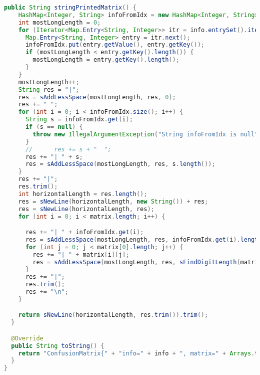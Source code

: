 \begin{lstlisting}[language=Java,basicstyle=\tiny,caption=ConfusionMatrix.java]
  public String stringPrintedMatrix() {
    HashMap<Integer, String> infoFromIdx = new HashMap<Integer, String>();
    int mostLongLength = 0;
    for (Iterator<Map.Entry<String, Integer>> itr = info.entrySet().iterator(); itr.hasNext(); ) {
      Map.Entry<String, Integer> entry = itr.next();
      infoFromIdx.put(entry.getValue(), entry.getKey());
      if (mostLongLength < entry.getKey().length()) {
        mostLongLength = entry.getKey().length();
      }
    }
    mostLongLength++;
    String res = "|";
    res = sAddLessSpace(mostLongLength, res, 0);
    res += " ";
    for (int i = 0; i < infoFromIdx.size(); i++) {
      String s = infoFromIdx.get(i);
      if (s == null) {
        throw new IllegalArgumentException("String infoFromIdx is null");
      }
      //      res += s + "  ";
      res += "| " + s;
      res = sAddLessSpace(mostLongLength, res, s.length());
    }
    res += "|";
    res.trim();
    int horizontalLength = res.length();
    res = sNewLine(horizontalLength, new String()) + res;
    res = sNewLine(horizontalLength, res);
    for (int i = 0; i < matrix.length; i++) {

      res += "| " + infoFromIdx.get(i);
      res = sAddLessSpace(mostLongLength, res, infoFromIdx.get(i).length());
      for (int j = 0; j < matrix[0].length; j++) {
        res += "| " + matrix[i][j];
        res = sAddLessSpace(mostLongLength, res, sFindDigitLength(matrix[i][j]));
      }
      res += "|";
      res.trim();
      res += "\n";
    }

    return sNewLine(horizontalLength, res.trim()).trim();
  }

  @Override
  public String toString() {
    return "ConfusionMatrix{" + "info=" + info + ", matrix=" + Arrays.toString(matrix) + '}';
  }
}
\end{lstlisting}


